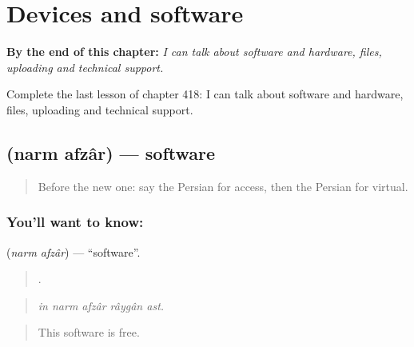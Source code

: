 
\chapter{Devices and software}
\label{ch:fa-devices-and-software}

\begin{chapteropening}
\textbf{By the end of this chapter:} \emph{I can talk about software and hardware, files, uploading and technical support.}

Complete the last lesson of chapter 418: I can talk about software and hardware, files, uploading and technical support.
\end{chapteropening}

\section[\texorpdfstring{\fa{نرم} \fa{افزار} (narm afzâr)}{نرم افزار (narm afzâr)}]{  (narm afzâr) — software}

\label{lesson:FA-C418-narm-afzar}



\begin{quote}
Before the new one: say the Persian for access, then the Persian for virtual.
\end{quote}

\subsection*{You'll want to know:  }
\textbf{ } (\emph{narm afzâr}) — \textquotedblleft{}software\textquotedblright{}.

\begin{quote}
    .
\end{quote}

\begin{quote}
\emph{in narm afzâr râygân ast.}
\end{quote}

\begin{quote}
This software is free.
\end{quote}

